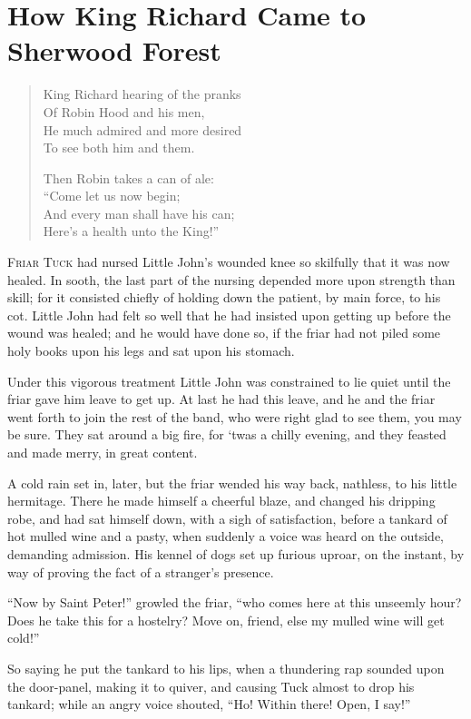 \chapter{How King Richard Came to Sherwood Forest}

\begin{quote}
King Richard hearing of the pranks\\
Of Robin Hood and his men,\\
He much admired and more desired\\
To see both him and them.

Then Robin takes a can of ale:\\
“Come let us now begin;\\
And every man shall have his can;\\
Here’s a health unto the King!”
\end{quote}

\lettrine{F}{riar Tuck} had nursed Little John's wounded knee so
skilfully that it was now healed. In sooth, the last part of the nursing
depended more upon strength than skill; for it consisted chiefly of
holding down the patient, by main force, to his cot. Little John had felt
so well that he had insisted upon getting up before the wound was healed;
and he would have done so, if the friar had not piled some holy books
upon his legs and sat upon his stomach.

Under this vigorous treatment Little John was constrained to lie quiet
until the friar gave him leave to get up. At last he had this leave, and
he and the friar went forth to join the rest of the band, who were right
glad to see them, you may be sure. They sat around a big fire, for `twas
a chilly evening, and they feasted and made merry, in great content.

A cold rain set in, later, but the friar wended his way back, nathless,
to his little hermitage. There he made himself a cheerful blaze, and
changed his dripping robe, and had sat himself down, with a sigh of
satisfaction, before a tankard of hot mulled wine and a pasty, when
suddenly a voice was heard on the outside, demanding admission. His
kennel of dogs set up furious uproar, on the instant, by way of proving
the fact of a stranger's presence.

``Now by Saint Peter!'' growled the friar, ``who comes here at this
unseemly hour? Does he take this for a hostelry? Move on, friend, else
my mulled wine will get cold!''

So saying he put the tankard to his lips, when a thundering rap sounded
upon the door-panel, making it to quiver, and causing Tuck almost to
drop his tankard; while an angry voice shouted, ``Ho! Within there!
Open, I say!''

